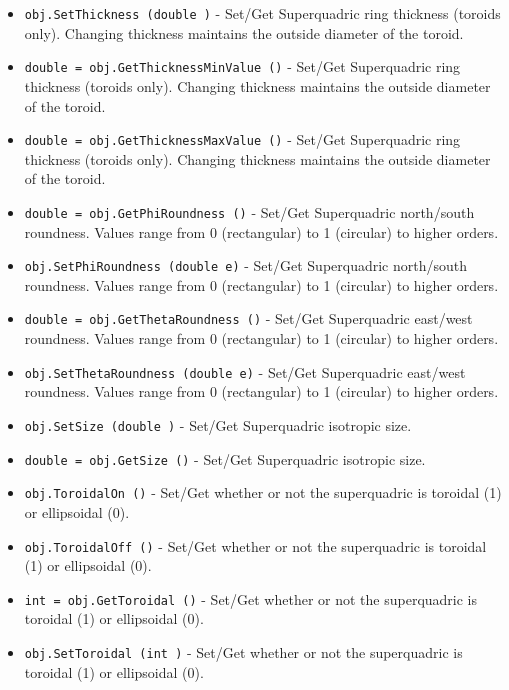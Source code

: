 \begin{itemize}
\item  \verb|obj.SetThickness (double )| -  Set/Get Superquadric ring thickness (toroids only).
 Changing thickness maintains the outside diameter of the toroid.

\item  \verb|double = obj.GetThicknessMinValue ()| -  Set/Get Superquadric ring thickness (toroids only).
 Changing thickness maintains the outside diameter of the toroid.

\item  \verb|double = obj.GetThicknessMaxValue ()| -  Set/Get Superquadric ring thickness (toroids only).
 Changing thickness maintains the outside diameter of the toroid.

\item  \verb|double = obj.GetPhiRoundness ()| -  Set/Get Superquadric north/south roundness. 
 Values range from 0 (rectangular) to 1 (circular) to higher orders.

\item  \verb|obj.SetPhiRoundness (double e)| -  Set/Get Superquadric north/south roundness. 
 Values range from 0 (rectangular) to 1 (circular) to higher orders.

\item  \verb|double = obj.GetThetaRoundness ()| -  Set/Get Superquadric east/west roundness.
 Values range from 0 (rectangular) to 1 (circular) to higher orders.

\item  \verb|obj.SetThetaRoundness (double e)| -  Set/Get Superquadric east/west roundness.
 Values range from 0 (rectangular) to 1 (circular) to higher orders.

\item  \verb|obj.SetSize (double )| -  Set/Get Superquadric isotropic size.

\item  \verb|double = obj.GetSize ()| -  Set/Get Superquadric isotropic size.

\item  \verb|obj.ToroidalOn ()| -  Set/Get whether or not the superquadric is toroidal (1) or ellipsoidal (0).

\item  \verb|obj.ToroidalOff ()| -  Set/Get whether or not the superquadric is toroidal (1) or ellipsoidal (0).

\item  \verb|int = obj.GetToroidal ()| -  Set/Get whether or not the superquadric is toroidal (1) or ellipsoidal (0).

\item  \verb|obj.SetToroidal (int )| -  Set/Get whether or not the superquadric is toroidal (1) or ellipsoidal (0).

\end{itemize}
